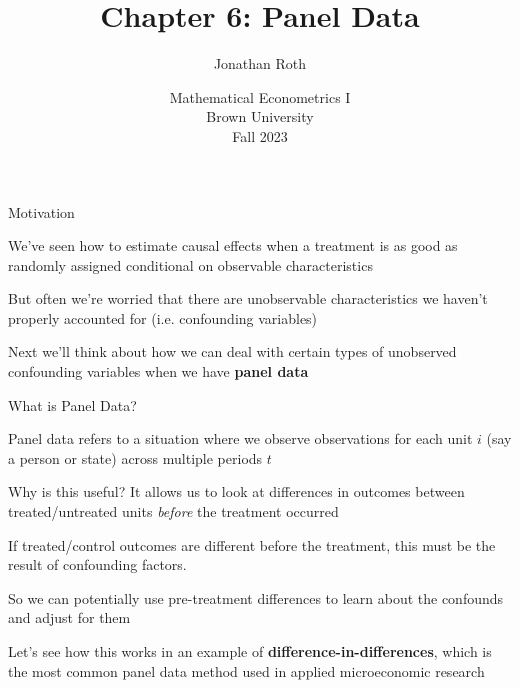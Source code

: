 \documentclass[11pt,english,handout]{beamer}
\newenvironment{wideitemize}{\itemize\addtolength{\itemsep}{10pt}}{\enditemize}
\begin{document}
	
	\begin{frame}[noframenumbering]{}
		\vspace{0.5cm}
		\title[]{Chapter 6: Panel Data}
		\author{Jonathan Roth}
		\date{Mathematical Econometrics I \\ Brown University\\ Fall 2023} 
		\titlepage {\small{}\ }\thispagestyle{empty} \vspace{-30pt}
		
	\end{frame}

	
	\begin{frame}{Motivation}
		
		\begin{wideitemize}
			\item
			We've seen how to estimate causal effects when a treatment is as good as randomly assigned conditional on observable characteristics
			
			\item
			But often we're worried that there are unobservable characteristics we haven't properly accounted for (i.e. confounding variables)
			
			\pause
			\item
			Next we'll think about how we can deal with certain types of unobserved confounding variables when we have \textbf{panel data}

			
		\end{wideitemize}

	\end{frame}

\begin{frame}{What is Panel Data?}
	\begin{wideitemize}
	\item
	Panel data refers to a situation where we observe observations for each unit $i$ (say a person or state) across multiple periods $t$				
	
	\pause
	\item
	Why is this useful? It allows us to look at differences in outcomes between treated/untreated units \textit{before} the treatment occurred
	
	\pause
	\item
	If treated/control outcomes are different before the treatment, this must be the result of confounding factors.
	
	\pause
	\item
	So we can potentially use pre-treatment differences to learn about the confounds and adjust for them
	
	\pause
	\item
	Let's see how this works in an example of \textbf{difference-in-differences}, which is the most common panel data method used in applied microeconomic research
	\end{wideitemize}

\end{frame}	
\end{document}
